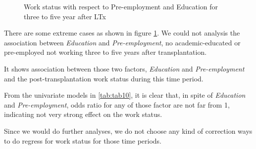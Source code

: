\documentclass[11pt, a4paper]{article}\usepackage[]{graphicx}\usepackage[]{color}
\newenvironment{knitrout}{}{} %
\begin{document}
{\begin{figure}[ht]
\begin{knitrout}
\end{knitrout}
\caption{Work status with respect to Pre-employment and Education for three to five year after LTx}\label{fig9}
\end{figure}


There are some extreme cases as shown in figure \ref{fig9}. We could not analysis the association between \textit{Education} and \textit{Pre-employment},
no academic-educated or pre-employed not working three to five years after transplantation.

It shows association between those two factors, \textit{Education} and \textit{Pre-employment} and the post-transplantation work status during this time period.

From the univariate models in \ref{tab:tab10}, it is clear that, in spite of \textit{Education} and \textit{Pre-employment}, odds ratio for any of those factor are not far from 1, indicating not very strong effect on the work status.

Since we would do further analyses, we do not choose any kind of correction ways to do regress for work status for those time periods.

\begin{table}[ht]
\centering
\caption{Univariate models for work status three to five years after LTx} 
\label{tab:tab10}
\end{table}



}
\end{document}
